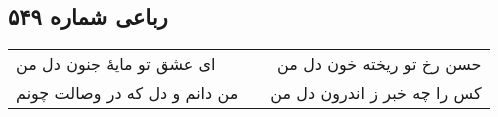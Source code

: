 \begin{center}
\section*{رباعی شماره ۵۴۹}
\label{sec:sh549}
\begin{longtable}{l p{0.5cm} r}
ای عشق تو مایهٔ جنون دل من
&&
حسن رخ تو ریخته خون دل من
\\
من دانم و دل که در وصالت چونم
&&
کس را چه خبر ز اندرون دل من
\\
\end{longtable}
\end{center}
